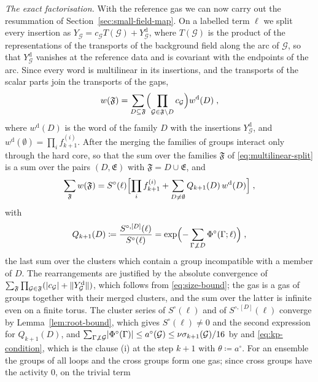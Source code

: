 \documentclass[11pt]{preprint}
\DeclarePairedDelimiter{\abs}{\lvert}{\rvert}
\DeclarePairedDelimiter{\norm}{\lVert}{\rVert}
\numberwithin{equation}{section}
\theoremstyle{definition}
\theoremstyle{remark}
\theoremstyle{plain}
\begin{document}
\emph{The exact factorisation.} With the reference gas we can now carry out the resummation of Section~\ref{sec:small-field-map}. On a labelled term $\ell$ we split every insertion as $Y_{\mathcal G} = c_{\mathcal G}T(\mathcal G) + Y^{\mathrm d}_{\mathcal G}$, where $T(\mathcal G)$ is the product of the representations of the transports of the background field along the arc of $\mathcal G$, so that $Y^{\mathrm d}_{\mathcal G}$ vanishes at the reference data and is covariant with the endpoints of the arc. Since every word is multilinear in its insertions, and the transports of the scalar parts join the transports of the gaps,
\begin{equation}\label{eq:multilinear-split}
    w(\mathfrak F) = \sum_{D \subseteq \mathfrak F}\Bigl(\prod_{\mathcal G \in \mathfrak F \setminus D}c_{\mathcal G}\Bigr)w^{\mathrm d}(D)\;,
\end{equation}
where $w^{\mathrm d}(D)$ is the word of the family $D$ with the insertions $Y^{\mathrm d}_{\mathcal G}$, and $w^{\mathrm d}(\emptyset) = \prod_if^{(i)}_{k+1}$. After the merging the families of groups interact only through the hard core, so that the sum over the families $\mathfrak F$ of \eqref{eq:multilinear-split} is a sum over the pairs $(D, \mathfrak E)$ with $\mathfrak F = D \cup \mathfrak E$, and
\begin{equation}\label{eq:exact-factorisation}
    \sum_{\mathfrak F}w(\mathfrak F) = S^\circ(\ell)\Bigl[\prod_if^{(i)}_{k+1} + \sum_{D \neq \emptyset}Q_{k+1}(D)\,w^{\mathrm d}(D)\Bigr]\;,
\end{equation}
with
\begin{equation}\label{eq:interaction-ratio}
    Q_{k+1}(D) \coloneqq \frac{S^{\circ,[D]}(\ell)}{S^\circ(\ell)} = \exp\Bigl(-\sum_{\Gamma \not\perp D}\Phi^\circ(\Gamma; \ell)\Bigr)\;,
\end{equation}
the last sum over the clusters which contain a group incompatible with a member of $D$. The rearrangements are justified by the absolute convergence of $\sum_{\mathfrak F}\prod_{\mathcal G \in \mathfrak F}(\abs{c_{\mathcal G}} + \norm{Y^{\mathrm d}_{\mathcal G}})$, which follows from \eqref{eq:size-bound}; the gas is a gas of groups together with their merged clusters, and the sum over the latter is infinite even on a finite torus. The cluster series of $S^\circ(\ell)$ and of $S^{\circ,[D]}(\ell)$ converge by Lemma~\ref{lem:root-bound}, which gives $S^\circ(\ell) \neq 0$ and the second expression for $Q_{k+1}(D)$, and $\sum_{\Gamma \not\perp \mathcal G}\abs{\Phi^\circ(\Gamma)} \leq a^\circ(\mathcal G) \leq \nu\sigma_{k+1}(\mathcal G)/16$ by \cite[Theorem~5.4]{FriedliVelenik} and \eqref{eq:kp-condition}, which is the clause (i) at the step $k + 1$ with $\theta \coloneqq a^\circ$. For an ensemble the groups of all loops and the cross groups form one gas; since cross groups have the activity $0$, on the trivial term
\end{document}
